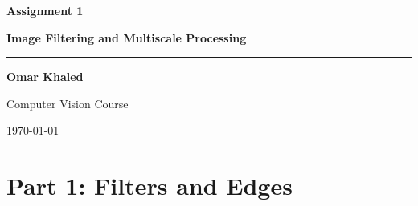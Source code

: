 \documentclass[12pt,a4paper]{article}
\begin{document}

\begin{titlepage}
  \centering
  \vspace*{2cm}
  {\Huge\bfseries\color{accent} Assignment 1\par}
  \vspace{0.5em}
  {\Large\bfseries Image Filtering and Multiscale Processing\par}
  \vspace{2em}
  \rule{0.7\linewidth}{1pt}
  \vspace{1.5em}

  {\large\bfseries Omar Khaled\par}
  \vspace{0.5em}
  {\normalsize Computer Vision Course\par}
  \vspace{2em}
  {\normalsize\today\par}

  \vfill
  \begin{abstract}
    \noindent
    This report presents the implementation and results for all three parts of
    Assignment~1.
    \textbf{Part~1} implements 2D convolution from scratch (loop, vectorised,
    and separable), finite-difference edge detection, and derivative-of-Gaussian
    (DoG) edge detection.
    \textbf{Part~2} covers frequency-domain analysis through hybrid images
    (\S\ref{sec:21}), anti-aliasing with Gaussian pre-filtering (\S\ref{sec:22}),
    Gaussian and Laplacian pyramids (\S\ref{sec:23}), and multiresolution image
    blending (\S\ref{sec:24}).
    \textbf{Part~3} implements seam-carving for content-aware image resizing.
    All output images are included inline; each section opens with a brief
    description of the method, states all parameters, shows the key images,
    and provides a focused discussion of the results.
  \end{abstract}
\end{titlepage}

\tableofcontents
\newpage

\section{Part 1: Filters and Edges}
\end{document}
